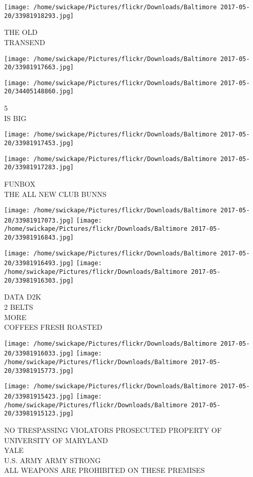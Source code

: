 \documentclass[10pt,letterpaper]{article}
\begin{document}
\vspace{0.25in}
\texttt{[image: /home/swickape/Pictures/flickr/Downloads/Baltimore 2017-05-20/33981918293.jpg]}

THE OLD\\
TRANSEND
\pagebreak

\texttt{[image: /home/swickape/Pictures/flickr/Downloads/Baltimore 2017-05-20/33981917663.jpg]}

\vspace{0.25in}
\texttt{[image: /home/swickape/Pictures/flickr/Downloads/Baltimore 2017-05-20/34405148860.jpg]}

5\\
IS BIG
\pagebreak

\texttt{[image: /home/swickape/Pictures/flickr/Downloads/Baltimore 2017-05-20/33981917453.jpg]}

\vspace{0.25in}
\texttt{[image: /home/swickape/Pictures/flickr/Downloads/Baltimore 2017-05-20/33981917283.jpg]}

FUNBOX\\
THE ALL NEW CLUB BUNNS
\pagebreak

\texttt{[image: /home/swickape/Pictures/flickr/Downloads/Baltimore 2017-05-20/33981917073.jpg]}
\texttt{[image: /home/swickape/Pictures/flickr/Downloads/Baltimore 2017-05-20/33981916843.jpg]}

\texttt{[image: /home/swickape/Pictures/flickr/Downloads/Baltimore 2017-05-20/33981916493.jpg]}
\texttt{[image: /home/swickape/Pictures/flickr/Downloads/Baltimore 2017-05-20/33981916303.jpg]}

DATA D2K\\
2 BELTS\\
MORE\\
COFFEES FRESH ROASTED
\pagebreak

\texttt{[image: /home/swickape/Pictures/flickr/Downloads/Baltimore 2017-05-20/33981916033.jpg]}
\texttt{[image: /home/swickape/Pictures/flickr/Downloads/Baltimore 2017-05-20/33981915773.jpg]}

\texttt{[image: /home/swickape/Pictures/flickr/Downloads/Baltimore 2017-05-20/33981915423.jpg]}
\texttt{[image: /home/swickape/Pictures/flickr/Downloads/Baltimore 2017-05-20/33981915123.jpg]}

NO TRESPASSING VIOLATORS PROSECUTED PROPERTY OF UNIVERSITY OF MARYLAND\\
YALE\\
U.S. ARMY ARMY STRONG\\
ALL WEAPONS ARE PROHIBITED ON THESE PREMISES
\pagebreak
\end{document}
